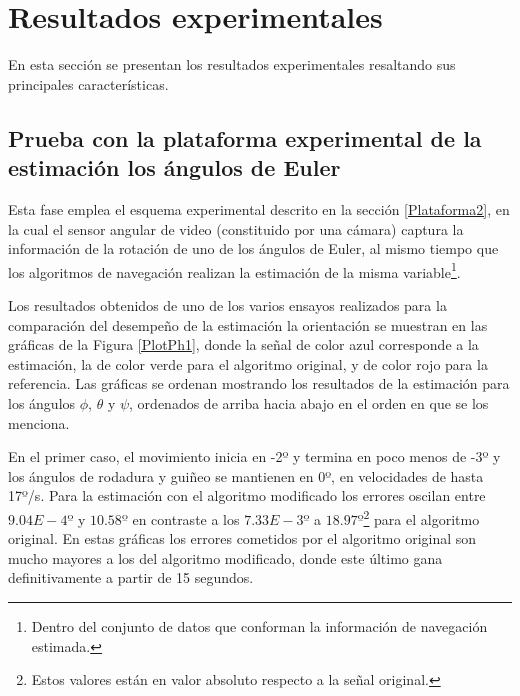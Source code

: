 \documentclass[conference]{IEEEtran}
\begin{document}
\section{Resultados experimentales}
En esta sección se presentan los resultados experimentales resaltando sus principales características.
\subsection{Prueba con la plataforma experimental de la estimación los ángulos de Euler}
Esta fase emplea el esquema experimental descrito en la sección \ref{Plataforma2}, en la cual el sensor angular de video (constituido por una cámara) captura la información de la rotación de uno de los ángulos de Euler, al mismo tiempo que los algoritmos de navegación realizan la estimación de la misma variable\footnote{Dentro del conjunto de datos que conforman la información de navegación estimada.}.\par
Los resultados obtenidos de uno de los varios ensayos realizados para la comparación del desempeño de la estimación la orientación se muestran en las gráficas de la Figura \ref{PlotPh1}, donde la señal de color azul corresponde a la estimación, la de color verde para el algoritmo original, y de color rojo para la referencia. Las gráficas se ordenan mostrando los resultados de la estimación para los ángulos $\phi$, $\theta$ y $\psi$, ordenados de arriba hacia abajo en el orden en que se los menciona.\par
En el primer caso, el movimiento inicia en -2º y termina en poco menos de -3º y los ángulos de rodadura y guiñeo se mantienen en 0º, en velocidades de hasta 17º/s. Para la estimación con el algoritmo modificado los errores oscilan entre $9.04E-4º$ y $10.58º$ en contraste a los $7.33E-3º$ a $18.97º$\footnote{Estos valores están en valor absoluto respecto a la señal original.} para el algoritmo original. 
En estas gráficas los errores cometidos por el algoritmo original son mucho mayores a los del algoritmo modificado, donde este último gana definitivamente a partir de 15 segundos.\par
\end{document}
